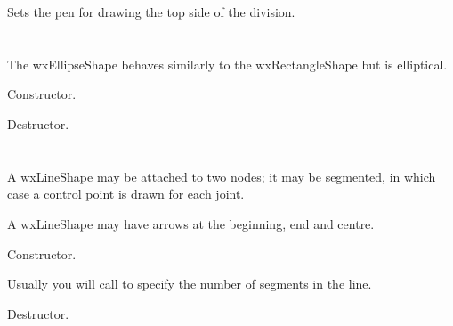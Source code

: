 
Sets the pen for drawing the top side of the division.

\section{}\label{wxellipseshape}

The wxEllipseShape behaves similarly to the wxRectangleShape but is
elliptical.






Constructor.



Destructor.

\section{}\label{wxlineshape}

A wxLineShape may be attached to two nodes; it may be segmented, in which
case a control point is drawn for each joint.

A wxLineShape may have arrows at the beginning, end and centre.






Constructor.

Usually you will call  to
specify the number of segments in the line.



Destructor.

